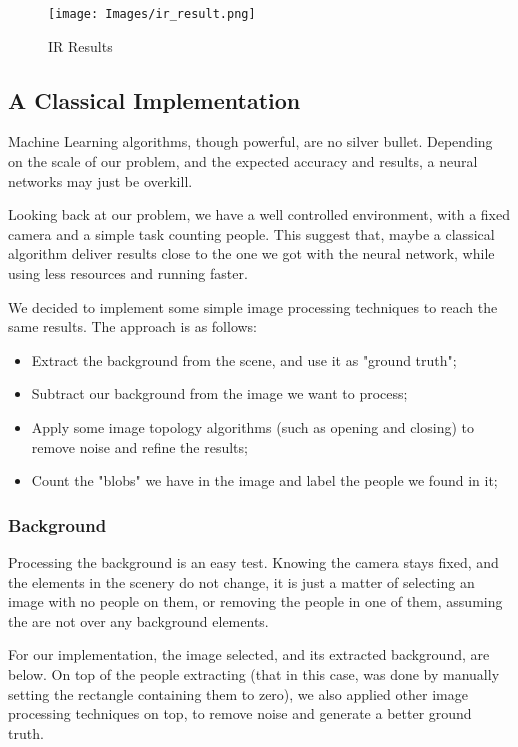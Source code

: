 \documentclass[conference]{IEEEtran}
\begin{document}
\begin{figure}[ht!]
    \centering
    \texttt{[image: Images/ir\_result.png]}
    \caption{IR Results}\label{fig:ir-results}
\end{figure}

\subsection{A Classical Implementation}

Machine Learning algorithms, though powerful, are no silver bullet. Depending on the scale of our problem, and the expected accuracy and results, a neural networks may just be overkill.

Looking back at our problem, we have a well controlled environment, with a fixed camera and a simple task counting people. This suggest that, maybe a classical algorithm deliver results close to the one we got with the neural network, while using less resources and running faster.

We decided to implement some simple image processing techniques to reach the same results. The approach is as follows:

\begin{itemize}
    \item Extract the background from the scene, and use it as "ground truth";
    \item Subtract our background from the image we want to process;
    \item Apply some image topology algorithms (such as opening and closing) to remove noise and refine the results;
    \item Count the "blobs" we have in the image and label the people we found in it;
\end{itemize}

\subsubsection{Background}

Processing the background is an easy test. Knowing the camera stays fixed, and the elements in the scenery do not change, it is just a matter of selecting an image with no people on them, or removing the people in one of them, assuming the are not over any background elements.

For our implementation, the image selected, and its extracted background, are below. On top of the people extracting (that in this case, was done by manually setting the rectangle containing them to zero), we also applied other image processing techniques on top, to remove noise and generate a better ground truth.
\end{document}
